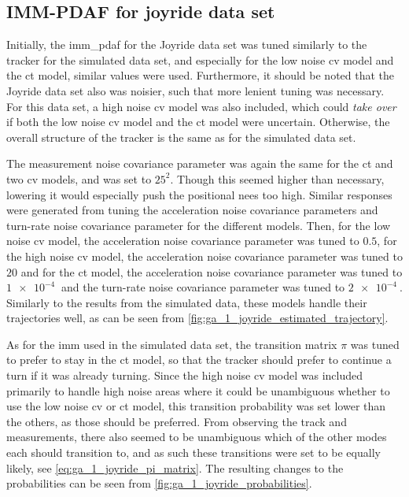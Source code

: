 \subsection{IMM-PDAF for joyride data set}
Initially, the \acrshort{imm_pdaf} for the Joyride data set was tuned similarly to the tracker for the simulated data set, and especially for the low noise \acrshort{cv} model and the \acrshort{ct} model, similar values were used. Furthermore, it should be noted that the Joyride data set also was noisier, such that more lenient tuning was necessary. For this data set, a high noise \acrshort{cv} model was also included, which could \textit{take over} if both the low noise \acrshort{cv} model and the \acrshort{ct} model were uncertain. Otherwise, the overall structure of the tracker is the same as for the simulated data set. 

The measurement noise covariance parameter was again the same for the \acrshort{ct} and two \acrshort{cv} models, and was set to $25^2$. Though this seemed higher than necessary, lowering it would especially push the positional \acrshort{nees} too high. Similar responses were generated from tuning the acceleration noise covariance parameters and turn-rate noise covariance parameter for the different models. Then, for the low noise \acrshort{cv} model, the acceleration noise covariance parameter was tuned to $0.5$, for the high noise \acrshort{cv} model, the acceleration noise covariance parameter was tuned to $20$ and for the \acrshort{ct} model, the acceleration noise covariance parameter was tuned to $\SI{1e-4}{}$ and the turn-rate noise covariance parameter was tuned to $\SI{2e-4}{}$. Similarly to the results from the simulated data, these models handle their trajectories well, as can be seen from \cref{fig:ga_1_joyride_estimated_trajectory}. 

As for the \acrshort{imm} used in the simulated data set, the transition matrix $\pi$ was tuned to prefer to stay in the \acrshort{ct} model, so that the tracker should prefer to continue a turn if it was already turning. Since the high noise \acrshort{cv} model was included primarily to handle high noise areas where it could be unambiguous whether to use the low noise \acrshort{cv} or \acrshort{ct} model, this transition probability was set lower than the others, as those should be preferred. From observing the track and measurements, there also seemed to be unambiguous which of the other modes each should transition to, and as such these transitions were set to be equally likely, see \cref{eq:ga_1_joyride_pi_matrix}. The resulting changes to the probabilities can be seen from \cref{fig:ga_1_joyride_probabilities}. 

